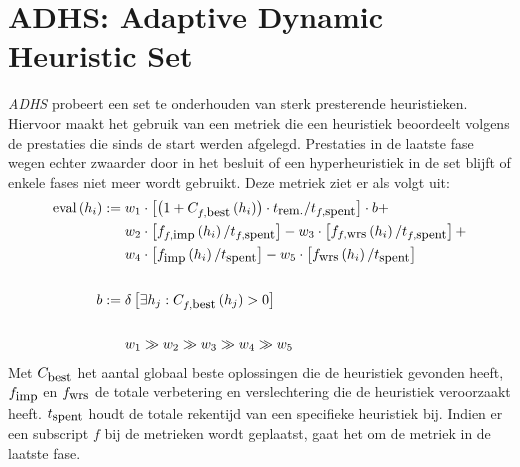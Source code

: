 \section{ADHS: Adaptive Dynamic Heuristic Set}

\emph{ADHS} probeert een set te onderhouden van sterk presterende heuristieken. Hiervoor maakt het gebruik van een metriek die een heuristiek beoordeelt volgens de prestaties die sinds de start werden afgelegd. Prestaties in de laatste fase wegen echter zwaarder door in het besluit of een hyperheuristiek in de set blijft of enkele fases niet meer wordt gebruikt. Deze metriek ziet er als volgt uit:
\begin{align*}
\mbox{eval}\left(h_i\right):={}&w_1\cdot\left[\left(1+C_{f,\mbox{\small{best}}}\left(h_i\right)\right)\cdot t_{\mbox{\small{rem.}}}/t_{f,\mbox{\small{spent}}}\right]\cdot b+\\
&w_2\cdot\left[f_{f,\mbox{\small{imp}}}\left(h_i\right)/t_{f,\mbox{\small{spent}}}\right]-w_3\cdot\left[f_{f,\mbox{\small{wrs}}}\left(h_i\right)/t_{f,\mbox{\small{spent}}}\right]+\\
&w_4\cdot\left[f_{\mbox{\small{imp}}}\left(h_i\right)/t_{\mbox{\small{spent}}}\right]-w_5\cdot\left[f_{\mbox{\small{wrs}}}\left(h_i\right)/t_{\mbox{\small{spent}}}\right]\\\\
b:={}&\delta\left[\exists h_j:C_{f,\mbox{\small{best}}}\left(h_j\right)>0\right]\\\\
&w_1\gg w_2\gg w_3\gg w_4\gg w_5
\end{align*}
Met $C_{\mbox{\small{best}}}$ het aantal globaal beste oplossingen die de heuristiek gevonden heeft, $f_{\mbox{\small{imp}}}$ en $f_{\mbox{\small{wrs}}}$ de totale verbetering en verslechtering die de heuristiek veroorzaakt heeft. $t_{\mbox{\small{spent}}}$ houdt de totale rekentijd van een specifieke heuristiek bij. Indien er een subscript $f$ bij de metrieken wordt geplaatst, gaat het om de metriek in de laatste fase.

